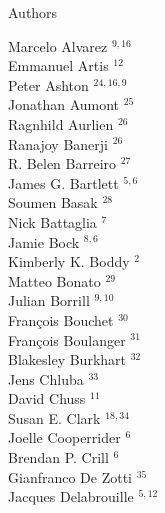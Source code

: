 \documentclass[PICOAPC.tex]{subfiles}
\begin{document}
\Large  {\centerline {Authors}}
%
\footnotesize {
\begin{multicols}{4}
Marcelo Alvarez $^{9,16}$                 \\
Emmanuel Artis $^{12}$                  \\
Peter Ashton $^{24,16,9}$                    \\
Jonathan Aumont $^{25}$                 \\
Ragnhild Aurlien $^{26}$                \\
Ranajoy Banerji $^{26}$                 \\
R. Belen Barreiro $^{27}$               \\
James G. Bartlett $^{5,6}$               \\
Soumen Basak $^{28}$                    \\
Nick Battaglia $^{7}$                  \\
Jamie Bock $^{8,6}$                      \\
Kimberly K. Boddy $^{2}$               \\
Matteo Bonato $^{29}$                   \\
Julian Borrill $^{9,10}$                  \\
Fran\c{c}ois Bouchet $^{30}$            \\
Fran\c{c}ois Boulanger $^{31}$          \\
Blakesley Burkhart $^{32}$              \\
Jens Chluba $^{33}$                     \\
David Chuss $^{11}$                     \\
Susan E. Clark $^{18,34}$                  \\
Joelle Cooperrider $^{6}$              \\
Brendan P. Crill $^{6}$                \\
Gianfranco De Zotti $^{35}$             \\
Jacques Delabrouille $^{5,12}$            \\

\end{multicols}}
\end{document}
